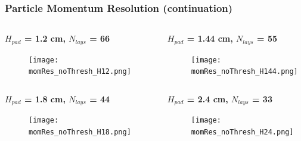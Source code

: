 \documentclass[svgnames] {beamer}
\begin{document}
\begin{frame}[shrink=20]

  \frametitle{Particle Momentum Resolution (continuation)}
  
  \begin{columns}[c]
    \begin{block}{}
      \textbf{$H_{pad}$ = 1.2 cm, $N_{lays}$ = 66}
      \begin{figure}[!h]
        \centering
        \texttt{[image: momRes\_noThresh\_H12.png]}
      \end{figure}
    \end{block}

    \begin{block}{}
      \textbf{$H_{pad}$ = 1.44 cm, $N_{lays}$ = 55}
      \begin{figure}[!h]
        \centering
        \texttt{[image: momRes\_noThresh\_H144.png]}
      \end{figure}
    \end{block}
  \end{columns}


  \begin{columns}[c]
    \begin{block}{}
      \textbf{$H_{pad}$ = 1.8 cm, $N_{lays}$ = 44}
      \begin{figure}[!h]
        \centering
        \texttt{[image: momRes\_noThresh\_H18.png]}
      \end{figure}
    \end{block}
      
    \begin{block}{}
      \textbf{$H_{pad}$ = 2.4 cm, $N_{lays}$ = 33}
      \begin{figure}[!h]
        \centering
        \texttt{[image: momRes\_noThresh\_H24.png]}
      \end{figure}
    \end{block}
  
  \end{columns}
\end{frame}

\end{document}
